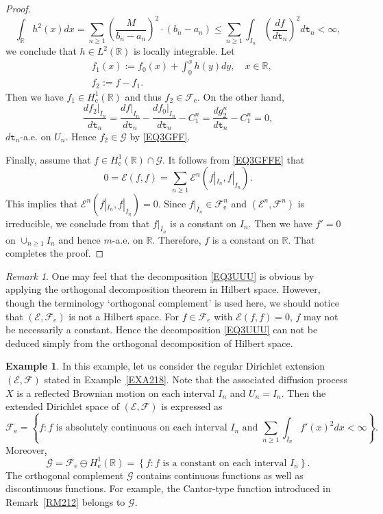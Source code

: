 \documentclass[a4paper]{amsart}
\theoremstyle{definition}
\newtheorem{example}[theorem]{Example}
\theoremstyle{remark}
\newtheorem{remark}[theorem]{Remark}
\numberwithin{equation}{section}
\begin{document}
\begin{proof}
\[
\int_\mathbb{R}h^2(x)dx=\sum_{n\geq 1} \left(\frac{M}{b_n-a_n}\right)^2\cdot (b_n-a_n)\leq \sum_{n\geq 1}\int_{I_n}\left(\frac{df}{d{{\mathtt{t}}}_n}\right)^2d{{\mathtt{t}}}_n<\infty,
\]
we conclude that $h\in L^2(\mathbb{R})$ is locally integrable. Let
\[
\begin{aligned}
	&f_1(x):=f_0(x)+\int_0^xh(y)dy,\quad x\in \mathbb{R}, \\
	&f_2:=f-f_1.
\end{aligned}\]
Then we have $f_1\in H^1_\mathrm{e}(\mathbb{R})$  and thus $f_2\in {{\mathcal{F}}}_\mathrm{e}$. On the other hand,
\[
	\frac{df_2|_{I_n}}{d{{\mathtt{t}}}_n}=\frac{df|_{I_n}}{d{{\mathtt{t}}}_n}-\frac{df_0|_{I_n}}{d{{\mathtt{t}}}_n}-C_1^n=\frac{dg^n_2}{d{{\mathtt{t}}}_n}-C^n_1=0,
\]
$d{{\mathtt{t}}}_n$-a.e. on $U_n$. Hence $f_2\in \mathcal{G}$ by \eqref{EQ3GFF}.

Finally, assume that $f\in H^1_\mathrm{e}(\mathbb{R})\cap \mathcal{G}$. It follows from \eqref{EQ3GFFE} that
\[
	0={{\mathcal{E}}}(f,f)=\sum_{n\geq 1}{{\mathcal{E}}}^n(f|_{I_n},f|_{I_n}).
\]
This implies that ${{\mathcal{E}}}^n(f|_{I_n},f|_{I_n})=0$. Since $f|_{I_n}\in {{\mathcal{F}}}^n_\mathrm{e}$ and $({{\mathcal{E}}}^n,{{\mathcal{F}}}^n)$ is irreducible,  we conclude from \cite[Theorem~5.2.16]{CF12} that $f|_{I_n}$ is a constant on $I_n$. Then we have $f'=0$ on $\cup_{n\geq 1}I_n$ and hence $m$-a.e. on $\mathbb{R}$. Therefore, $f$ is a constant on $\mathbb{R}$. That completes the proof.
\end{proof}

\begin{remark} One may feel that the decomposition \eqref{EQ3UUU} is obvious by applying the orthogonal decomposition theorem in Hilbert space. However, though the terminology `orthogonal complement' is used here, we should notice that $({{\mathcal{E}}},{{\mathcal{F}}}_e)$ is not a Hilbert space. For $f\in {{\mathcal{F}}}_e$ with ${{\mathcal{E}}}(f,f)=0$, $f$ may not be necessarily a constant. Hence the decomposition \eqref{EQ3UUU} can not be deduced simply from the orthogonal decomposition of Hilbert space.
\end{remark}

\begin{example}
In this example, let us consider the regular Dirichlet extension $({{\mathcal{E}}},{{\mathcal{F}}})$ stated in Example~\ref{EXA218}. Note that the associated diffusion process $X$ is a reflected Brownian motion on each interval $I_n$ and $U_n=I_n$. Then the extended Dirichlet space of $({{\mathcal{E}}},{{\mathcal{F}}})$ is expressed as
\[
	{{\mathcal{F}}}_\mathrm{e}=\left\{ f: f \text{ is absolutely continuous on each interval }I_n\text{ and } \sum_{n\geq 1}\int_{I_n}f'(x)^2dx<\infty\right\}.
\]
Moreover,
\[
	\mathcal{G}={{\mathcal{F}}}_\mathrm{e}\ominus H^1_\mathrm{e}(\mathbb{R})= \left\{f: f \text{ is a constant on each interval }I_n \right\}.
\]
The orthogonal complement $\mathcal{G}$ contains continuous  functions as well as discontinuous functions. For example, the Cantor-type function introduced in Remark~\ref{RM212} belongs to $\mathcal{G}$.
\end{example}
\end{document}
